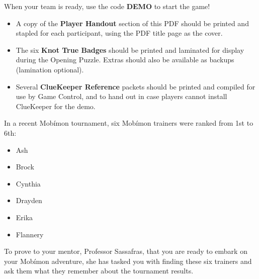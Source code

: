 \documentclass{puzzlehunt}
\begin{document}
When your team is ready, use the code \textbf{DEMO}
  to start the game!













\begin{itemize}
\item A copy of the \textbf{Player Handout} section of this PDF should
be printed and stapled for each participant, using the PDF title page
as the cover.

\item The six \textbf{Knot True Badges} should be printed and laminated
for display during the Opening Puzzle.
Extras should also be available as backups (lamination optional).

\item Several \textbf{ClueKeeper Reference} packets should be printed
and compiled for use by Game Control, and to hand out in case
players cannot install ClueKeeper for the demo.
\end{itemize}






In a recent Mob\'imon tournament, six Mob\'imon trainers were ranked from 1st to 6th:

\begin{multicols}{3}
\begin{itemize}
\item Ash
\item Brock
\item Cynthia
\item Drayden
\item Erika
\item Flannery
\end{itemize}
\end{multicols}

To prove to your mentor, Professor Sassafras, that you are ready to embark on your Mob\'imon adventure, she has tasked you with finding these six trainers and ask them what they remember about the tournament results.
\end{document}
